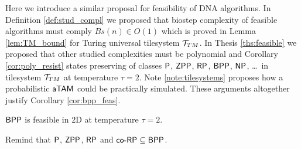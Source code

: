 	Here we introduce a similar proposal for feasibility of DNA algorithms. In Definition \ref{def:stud_compl} we proposed that biostep complexity of feasible algorithms must comply $Bs(n)\in O(1)$ which is proved in Lemma \ref{lem:TM_bound} for Turing universal tilesystem ${\cal T}_{TM}$. In Thesis \ref{ths:feasible} we proposed that other studied complexities must be polynomial and Corollary \ref{cor:poly_resist} states preserving of classes $\P$, $\ZPP$, $\RP$, $\BPP$, $\NP$, \ldots ~in tilesystem ${\cal T}_{TM}$ at temperature $\tau=2$. Note \ref{note:tilesystems} proposes how a probabilistic $\atam$ could be practically simulated. These arguments altogether justify Corollary \ref{cor:bpp_feas}.
	
	\begin{cor}
	\label{cor:bpp_feas}
		$\BPP$ is feasible in 2D at temperature $\tau=2$.
	\end{cor}
	
	\begin{note}
		Remind that $\P$, $\ZPP$, $\RP$ and $\coRP \subseteq \BPP$.
	\end{note}
	